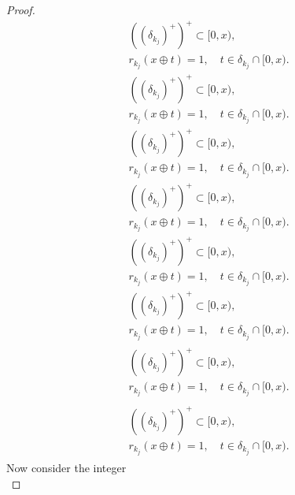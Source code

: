 \documentclass{amsart}
\numberwithin{equation}{section}
\begin{document}
\begin{proof}
{\begin{align*}
&\left(\left(\delta_{k_j}\right)^+\right)^+\subset [0,x),\label{a30}\\
&r_{k_j}(x\oplus t)= 1,\quad t\in\delta_{k_j}\cap[0,x).\label{a29}
\end{align*}\fi   
{}\begin{align}
&\left(\left(\delta_{k_j}\right)^+\right)^+\subset [0,x),\label{a30}\\
&r_{k_j}(x\oplus t)= 1,\quad t\in\delta_{k_j}\cap[0,x).\label{a29}
\end{align}\fi    
{}\begin{gather*}
&\left(\left(\delta_{k_j}\right)^+\right)^+\subset [0,x),\label{a30}\\
&r_{k_j}(x\oplus t)= 1,\quad t\in\delta_{k_j}\cap[0,x).\label{a29}
\end{gather*}\fi  
{}\begin{gather}
&\left(\left(\delta_{k_j}\right)^+\right)^+\subset [0,x),\label{a30}\\
&r_{k_j}(x\oplus t)= 1,\quad t\in\delta_{k_j}\cap[0,x).\label{a29}
\end{gather}\fi   
{}\begin{multline*}
&\left(\left(\delta_{k_j}\right)^+\right)^+\subset [0,x),\label{a30}\\
&r_{k_j}(x\oplus t)= 1,\quad t\in\delta_{k_j}\cap[0,x).\label{a29}
\end{multline*}\fi  
{}\begin{multline}
&\left(\left(\delta_{k_j}\right)^+\right)^+\subset [0,x),\label{a30}\\
&r_{k_j}(x\oplus t)= 1,\quad t\in\delta_{k_j}\cap[0,x).\label{a29}
\end{multline}\fi  
{}\begin{multline*}\begin{split}
&\left(\left(\delta_{k_j}\right)^+\right)^+\subset [0,x),\label{a30}\\
&r_{k_j}(x\oplus t)= 1,\quad t\in\delta_{k_j}\cap[0,x).\label{a29}
\end{split}\end{multline*}\fi
{}\begin{multline}\begin{split}
&\left(\left(\delta_{k_j}\right)^+\right)^+\subset [0,x),\label{a30}\\
&r_{k_j}(x\oplus t)= 1,\quad t\in\delta_{k_j}\cap[0,x).\label{a29}
\end{split}\end{multline}\fi
}
Now consider the integer
{
\begin{equation*} 

\end{equation*}}
\end{proof}
\end{document}
